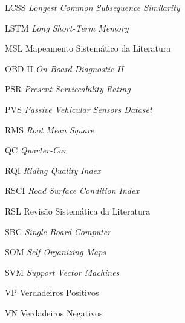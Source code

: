 \begin{siglas}
\item[LCSS] \textit{Longest Common Subsequence Similarity}
\item[LSTM] \textit{Long Short-Term Memory}
\item[MSL] Mapeamento Sistemático da Literatura
\item[OBD-II] \textit{On-Board Diagnostic II}
\item[PSR] \textit{Present Serviceability Rating}
\item[PVS] \textit{Passive  Vehicular  Sensors  Dataset}
\item[RMS] \textit{Root Mean Square}
\item[QC] \textit{Quarter-Car}
\item[RQI] \textit{Riding Quality Index}
\item[RSCI] \textit{Road Surface Condition Index}
\item[RSL] Revisão Sistemática da Literatura
\item[SBC] \textit{Single-Board  Computer}
\item[SOM] \textit{Self Organizing Maps}
\item[SVM] \textit{Support Vector Machines}
\item[VP] Verdadeiros Positivos
\item[VN] Verdadeiros Negativos
\end{siglas}
